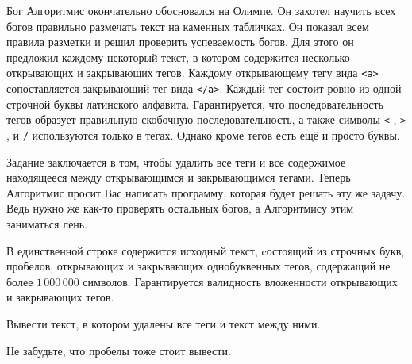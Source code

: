 Бог Алгоритмис окончательно обосновался на Олимпе.  Он захотел научить всех
богов правильно размечать текст на каменных табличках.  Он показал всем правила
разметки и решил проверить успеваемость богов.  Для этого он предложил каждому
некоторый текст, в котором содержится несколько открывающих и закрывающих
тегов.  Каждому открывающему тегу вида \texttt{<a>} сопоставляется  закрывающий
тег вида  \texttt{</a>}. Каждый тег состоит ровно из одной строчной буквы
латинского алфавита. Гарантируется, что последовательность тегов образует
правильную скобочную последовательность, а также символы \texttt{<}
, \texttt{>} , и \texttt{/} используются только в тегах. Однако кроме тегов
есть ещё и просто буквы.

Задание заключается в том, чтобы удалить все теги и все содержимое находящееся
между открывающимся и закрывающимся тегами. Теперь Алгоритмис просит Вас
написать программу, которая будет решать эту же задачу. Ведь нужно же как-то
проверять остальных богов, а Алгоритмису этим заниматься лень.

\InputFile

В единственной строке содержится исходный текст, cостоящий из строчных букв,
пробелов, открывающих и закрывающих однобуквенных тегов, содержащий не более
$1\,000\,000$ символов. Гарантируется валидность вложенности открывающих
и закрывающих тегов.

\OutputFile

Вывести текст, в котором удалены все теги и текст между ними.

\SAMPLES

\Note

Не забудьте, что пробелы тоже стоит вывести.
